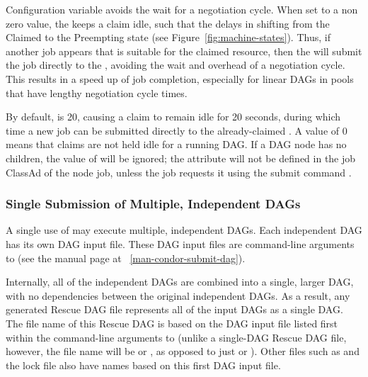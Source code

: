 Configuration variable
avoids the wait for a negotiation cycle.
When set to a non zero value, 
the  keeps a claim idle,
such that the  delays in shifting from
the Claimed to the Preempting state (see Figure~\ref{fig:machine-states}).
Thus, if another job appears that is suitable for the claimed resource,
then the  will submit the job directly to the , 
avoiding the wait and overhead of a negotiation cycle.
This results in a speed up of job completion,
especially for linear DAGs in pools that have lengthy negotiation cycle times.

By default,  is 20, 
causing a claim to remain idle for 20 seconds, 
during which time a new job can be submitted
directly to the already-claimed . 
A value of 0 means that claims are not held idle for a running DAG.
If a DAG node has no children,
the value of  will be ignored;
the  attribute will not be defined in the job ClassAd 
of the node job, unless the job requests it using the submit command
. 

\subsubsection{\label{sec:MultipleDAGs}Single Submission of Multiple, Independent DAGs}

A single use of  may execute multiple, independent DAGs.
Each independent DAG has its own DAG input file.
These DAG input files are command-line arguments to
(see the  manual page at ~\ref{man-condor-submit-dag}).

Internally, all of the independent DAGs are combined
into a single, larger DAG, with no dependencies between
the original independent DAGs.
As a result,
any generated Rescue DAG file represents all of the input DAGs
as a single DAG.
The file name of this Rescue DAG is based on the DAG input file
listed first within the command-line arguments to
 (unlike a single-DAG Rescue DAG file, however,
the file name will be
 or
,
as opposed to
just 
or ).
Other files such
as  and the lock file also have names based on this
first DAG input file.

